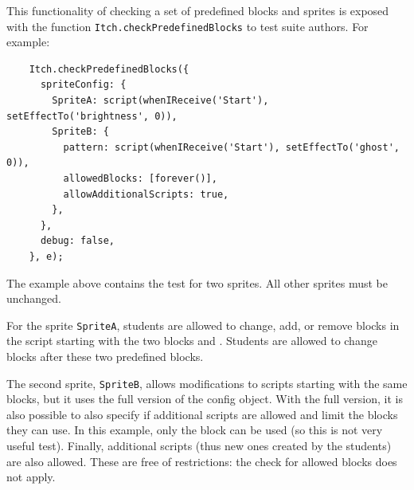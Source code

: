 \documentclass[../main]{subfiles}
\begin{document}
This functionality of checking a set of predefined blocks and sprites is exposed with the function \texttt{Itch.checkPredefinedBlocks} to test suite authors.
For example:

\begin{verbatim}
    Itch.checkPredefinedBlocks({
      spriteConfig: {
        SpriteA: script(whenIReceive('Start'), setEffectTo('brightness', 0)),
        SpriteB: {
          pattern: script(whenIReceive('Start'), setEffectTo('ghost', 0)),
          allowedBlocks: [forever()],
          allowAdditionalScripts: true,
        },
      },
      debug: false,
    }, e);
\end{verbatim}

The example above contains the test for two sprites.
All other sprites must be unchanged.

For the sprite \texttt{SpriteA}, students are allowed to change, add, or remove blocks in the script starting with the two blocks  and .
Students are allowed to change blocks after these two predefined blocks.

The second sprite, \texttt{SpriteB}, allows modifications to scripts starting with the same blocks, but it uses the full version of the config object.
With the full version, it is also possible to also specify if additional scripts are allowed and limit the blocks they can use.
In this example, only the  block can be used (so this is not very useful test).
Finally, additional scripts (thus new ones created by the students) are also allowed.
These are free of restrictions: the check for allowed blocks does not apply.
\end{document}
